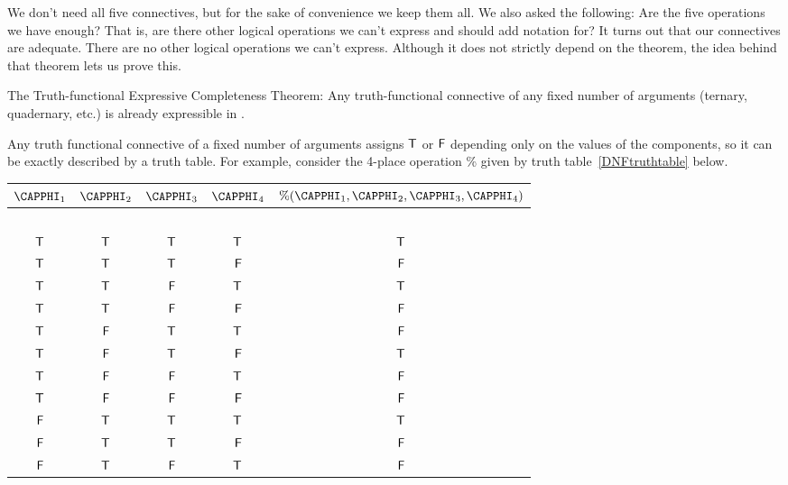 \noindent{}We don't need all five connectives, but for the sake of convenience we keep them all.  We also asked the following: 
Are the five operations we have enough? 
That is, are there other logical operations we can't express and should add notation for? 
It turns out that our connectives are adequate. 
There are no other logical operations we can't express.
Although it does not strictly depend on the  theorem, the idea behind that theorem lets us prove this.
\begin{THEOREM}{ The Truth-functional Expressive Completeness Theorem:}
Any truth-functional connective of any fixed number of arguments (ternary, quadernary, etc.) is already expressible in \GSL{}.
\end{THEOREM}
\begin{PROOF}
Any truth functional connective of a fixed number of arguments assigns $\mathsf{T}$ or $\mathsf{F}$ depending only on the values of the components, so it can be exactly described by a truth table. 
For example, consider the 4-place operation \% given by truth \mbox{table \ref{DNFtruthtable}} below.
\begin{table}[!ht]
\begin{center}
\begin{tabular}{ c c c c c}
$\CAPPHI_1$ & $\CAPPHI_2$ & $\CAPPHI_3$ & $\CAPPHI_4$ & $\text{\%}(\CAPPHI_1,\CAPPHI_2,\CAPPHI_3,\CAPPHI_4)$ \\
\hline
$ $ $ $ \\[-.25cm]
$\mathsf{T}$ & $\mathsf{T}$ & $\mathsf{T}$ & $\mathsf{T}$ & $\mathsf{T}$ \\
$\mathsf{T}$ & $\mathsf{T}$ & $\mathsf{T}$ & $\mathsf{F}$&$\mathsf{F}$ \\
$\mathsf{T}$ & $\mathsf{T}$ & $\mathsf{F}$ & $\mathsf{T}$ & $\mathsf{T}$ \\
$\mathsf{T}$ & $\mathsf{T}$ & $\mathsf{F}$ & $\mathsf{F}$  &$\mathsf{F}$ \\
$\mathsf{T}$ &  $\mathsf{F}$& $\mathsf{T}$ & $\mathsf{T}$	&$\mathsf{F}$ \\
$\mathsf{T}$ & $\mathsf{F}$ & $\mathsf{T}$ & $\mathsf{F}$	& $\mathsf{T}$ \\
$\mathsf{T}$ &$\mathsf{F}$  & $\mathsf{F}$& $\mathsf{T}$	&$\mathsf{F}$ \\
$\mathsf{T}$ & $\mathsf{F}$ &$\mathsf{F}$	& $\mathsf{F}$	&$\mathsf{F}$ \\
$\mathsf{F}$	& $\mathsf{T}$ & $\mathsf{T}$ & $\mathsf{T}$	& $\mathsf{T}$ \\
$\mathsf{F}$	& $\mathsf{T}$ & $\mathsf{T}$ & $\mathsf{F}$	&$\mathsf{F}$ \\
$\mathsf{F}$	& $\mathsf{T}$ & $\mathsf{F}$&	$\mathsf{T}$ &$\mathsf{F}$ \\

\end{tabular}
\end{center}
\end{table}
\end{PROOF}
